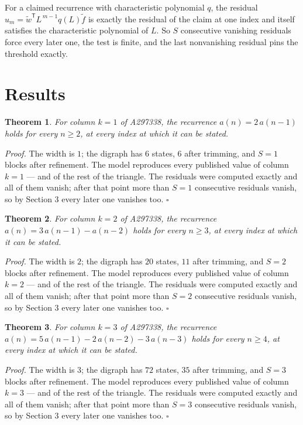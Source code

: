 \documentclass[11pt]{article}
\newtheorem{theorem}{Theorem}
\theoremstyle{definition}
\begin{document}
For a claimed recurrence with characteristic polynomial $q$, the residual $u_m = \tilde w^{\mathsf T}L^{\,m-1}q(L)\tilde f$ is exactly the residual of the claim at one index and itself satisfies the characteristic polynomial of $L$. So $S$ consecutive vanishing residuals force every later one, the test is finite, and the last nonvanishing residual pins the threshold exactly.

\section{Results}

\begin{theorem} For column $k = 1$ of A297338, the recurrence $a(n) = 2\,a(n-1)$ holds for every $n \ge 2$, at every index at which it can be stated.\end{theorem}

{\itshape Proof.} The width is $1$; the digraph has $6$ states, $6$ after trimming, and $S = 1$ blocks after refinement. The model reproduces every published value of column $k = 1$ --- and of the rest of the triangle. The residuals were computed exactly and all of them vanish; after that point more than $S = 1$ consecutive residuals vanish, so by Section 3 every later one vanishes too. $\square$

\begin{theorem} For column $k = 2$ of A297338, the recurrence $a(n) = 3\,a(n-1) - a(n-2)$ holds for every $n \ge 3$, at every index at which it can be stated.\end{theorem}

{\itshape Proof.} The width is $2$; the digraph has $20$ states, $11$ after trimming, and $S = 2$ blocks after refinement. The model reproduces every published value of column $k = 2$ --- and of the rest of the triangle. The residuals were computed exactly and all of them vanish; after that point more than $S = 2$ consecutive residuals vanish, so by Section 3 every later one vanishes too. $\square$

\begin{theorem} For column $k = 3$ of A297338, the recurrence $a(n) = 5\,a(n-1) - 2\,a(n-2) - 3\,a(n-3)$ holds for every $n \ge 4$, at every index at which it can be stated.\end{theorem}

{\itshape Proof.} The width is $3$; the digraph has $72$ states, $35$ after trimming, and $S = 3$ blocks after refinement. The model reproduces every published value of column $k = 3$ --- and of the rest of the triangle. The residuals were computed exactly and all of them vanish; after that point more than $S = 3$ consecutive residuals vanish, so by Section 3 every later one vanishes too. $\square$
\end{document}
